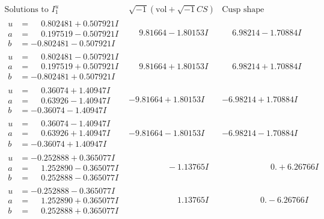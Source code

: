 \documentclass[1p]{elsarticle_modified}
\theoremstyle{definition}
\newcommand{\I}{\sqrt{-1}}
\begin{document}
$$\begin{array}{c|c|c}  
\text{Solutions to }I^u_{1}& \I (\text{vol} + \sqrt{-1}CS) & \text{Cusp shape}\\
 \hline 
\begin{aligned}
u &= \phantom{-}0.802481 + 0.507921 I \\
a &= \phantom{-}0.197519 - 0.507921 I \\
b &= -0.802481 - 0.507921 I\end{aligned}
 & \phantom{-}9.81664 - 1.80153 I & \phantom{-}6.98214 - 1.70884 I \\ \hline\begin{aligned}
u &= \phantom{-}0.802481 - 0.507921 I \\
a &= \phantom{-}0.197519 + 0.507921 I \\
b &= -0.802481 + 0.507921 I\end{aligned}
 & \phantom{-}9.81664 + 1.80153 I & \phantom{-}6.98214 + 1.70884 I \\ \hline\begin{aligned}
u &= \phantom{-}0.36074 + 1.40947 I \\
a &= \phantom{-}0.63926 - 1.40947 I \\
b &= -0.36074 - 1.40947 I\end{aligned}
 & -9.81664 + 1.80153 I & -6.98214 + 1.70884 I \\ \hline\begin{aligned}
u &= \phantom{-}0.36074 - 1.40947 I \\
a &= \phantom{-}0.63926 + 1.40947 I \\
b &= -0.36074 + 1.40947 I\end{aligned}
 & -9.81664 - 1.80153 I & -6.98214 - 1.70884 I \\ \hline\begin{aligned}
u &= -0.252888 + 0.365077 I \\
a &= \phantom{-}1.252890 - 0.365077 I \\
b &= \phantom{-}0.252888 - 0.365077 I\end{aligned}
 & \phantom{-0.000000 } -1.13765 I & \phantom{-0.000000 -}0. + 6.26766 I \\ \hline\begin{aligned}
u &= -0.252888 - 0.365077 I \\
a &= \phantom{-}1.252890 + 0.365077 I \\
b &= \phantom{-}0.252888 + 0.365077 I\end{aligned}
 & \phantom{-0.000000 -}1.13765 I & \phantom{-0.000000 } 0. - 6.26766 I \\ \hline\begin{aligned}

\end{aligned}
\end{array}$$
\end{document}
